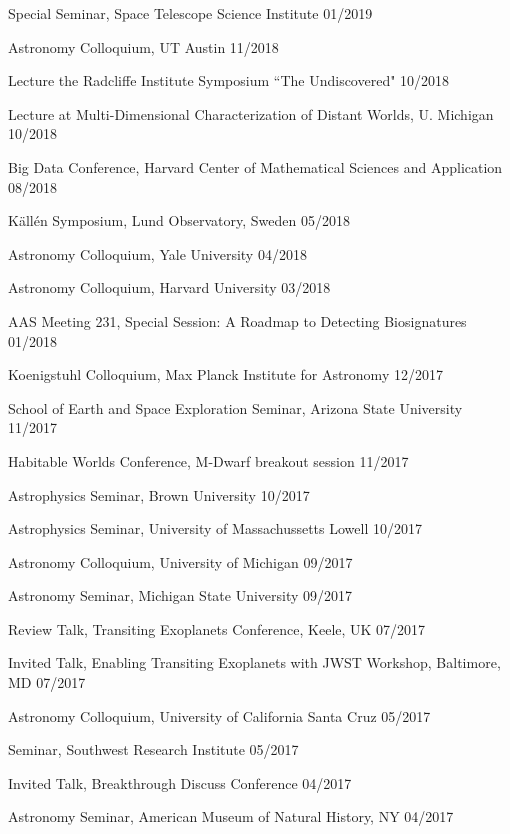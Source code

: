 \documentclass[12pt,letterpaper]{article}
\begin{document}
\begin{list}{}{\cvlist}
\item {Special Seminar, Space Telescope Science Institute \hfill 01/2019}
\item {Astronomy Colloquium, UT Austin \hfill 11/2018}
\item {Lecture the Radcliffe Institute Symposium ``The Undiscovered" \hfill 10/2018}
\item {Lecture at Multi-Dimensional Characterization of Distant Worlds, U. Michigan \hfill 10/2018}
\item {Big Data Conference, Harvard Center of Mathematical Sciences and Application \hfill 08/2018}
\item {K\"{a}ll\'{e}n Symposium, Lund Observatory, Sweden \hfill 05/2018}
\item {Astronomy Colloquium, Yale University \hfill 04/2018}
\item{Astronomy Colloquium, Harvard University \hfill 03/2018}
\item {AAS Meeting 231, Special Session: A Roadmap to Detecting Biosignatures \hfill 01/2018}
\item {Koenigstuhl Colloquium, Max Planck Institute for Astronomy \hfill 12/2017}
\item {School of Earth and Space Exploration Seminar, Arizona State University \hfill 11/2017}
\item {Habitable Worlds Conference, M-Dwarf breakout session \hfill 11/2017}
\item {Astrophysics Seminar, Brown University \hfill 10/2017}
\item {Astrophysics Seminar, University of Massachussetts Lowell \hfill 10/2017}
\item {Astronomy Colloquium, University of Michigan \hfill 09/2017}
\item {Astronomy Seminar, Michigan State University \hfill 09/2017}
\item {Review Talk, Transiting Exoplanets Conference, Keele, UK \hfill 07/2017}
\item {Invited Talk, Enabling Transiting Exoplanets with JWST Workshop, Baltimore, MD \hfill 07/2017}
\item {Astronomy Colloquium, University of California Santa Cruz \hfill 05/2017}
\item {Seminar, Southwest Research Institute \hfill 05/2017}
\item {Invited Talk, Breakthrough Discuss Conference \hfill 04/2017}
\item {Astronomy Seminar, American Museum of Natural History, NY \hfill 04/2017}

\end{list}
\end{document}
